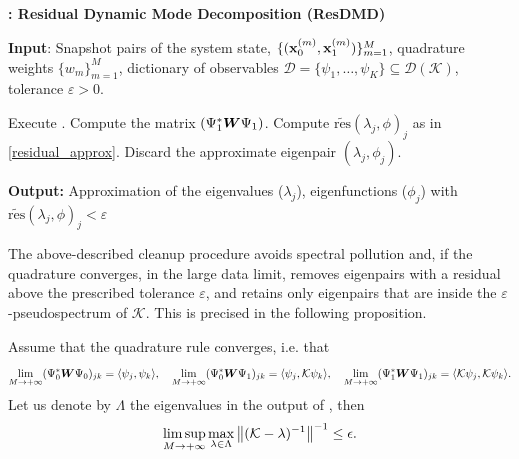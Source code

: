\begin{algorithm}
\caption{\textbf{: Residual Dynamic Mode Decomposition (ResDMD)}}
\label{alg_resdmd}
\textbf{Input}: Snapshot pairs of the system state, $\{(\vb{x}_0^{(m)}, \vb{x}_1^{(m)})\}_{m = 1}^M$, quadrature weights $\{w_m\}_{m = 1}^M$, dictionary of observables $\mathcal{D} = \{\psi_1, \dots, \psi_K\} \subseteq \mathcal{D}(\mathcal{K})$, tolerance $\varepsilon > 0$.
\begin{algorithmic}[1]
\State Execute .
\State Compute the matrix $(\Psi_1^*\vb*{W}\Psi_1)$.
    \State Compute $\widetilde{\mathrm{res}}(\lambda_j, \phi)_j$ as in \eqref{residual_approx}.
        \State Discard the approximate eigenpair $(\lambda_j,\phi_j)$.
    \EndIf
\EndFor
\end{algorithmic}
\textbf{Output:} Approximation of the eigenvalues ($\lambda_j$), eigenfunctions ($\phi_j$) with $\widetilde{\mathrm{res}}(\lambda_j, \phi)_j < \varepsilon$
\end{algorithm}

The above-described cleanup procedure avoids spectral pollution and, if the quadrature converges, in the large data limit, removes eigenpairs with a residual above the prescribed tolerance $\varepsilon$, and retains only eigenpairs that are inside the $\varepsilon$-pseudospectrum of $\mathcal{K}$. This is precised in the following proposition.
\begin{prop}
Assume that the quadrature rule converges, i.e. that
\begin{equation*}
    \lim_{M\to+\infty}(\Psi_0^*\vb*{W}\Psi_0)_{jk} = \langle \psi_j, \psi_k \rangle, \quad
    \lim_{M\to+\infty}(\Psi_0^*\vb*{W}\Psi_1)_{jk} = \langle \psi_j, \mathcal{K}\psi_k \rangle, \quad
    \lim_{M\to+\infty}(\Psi_1^*\vb*{W}\Psi_1)_{jk} = \langle \mathcal{K}\psi_j, \mathcal{K}\psi_k \rangle.
\end{equation*}
Let us denote by $\Lambda$ the eigenvalues in the output of , then
\begin{equation}
    \limsup_{M\to+\infty} \max_{\lambda\in\Lambda}\norm{(\mathcal{K} - \lambda)^{-1}}^{-1} \leq \epsilon.
\end{equation}
\end{prop}

